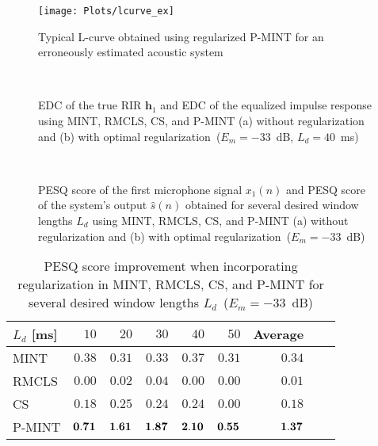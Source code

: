\documentclass[draftcls,onecolumn,11pt]{IEEEtran}
\begin{document}
\begin{figure}[h]
\centering
\texttt{[image: Plots/lcurve\_ex]}
\caption{Typical L-curve obtained using regularized P-MINT for an erroneously estimated acoustic system}
\label{fig: lcurveex}
\end{figure}

\begin{figure*}[h]
\centering
\hbox{\hspace{-1.1cm}
}
\caption{EDC of the true RIR $\mathbf{h}_1$ and EDC of the equalized impulse response using MINT, RMCLS, CS, and P-MINT (a) without regularization and (b) with optimal regularization~($E_m = -33$~dB, $L_d = 40$~ms)}
\end{figure*}
\begin{figure*}[h]
\centering
\hbox{\hspace{-1.1cm}
}
\caption{PESQ score of the first microphone signal $x_1(n)$ and PESQ score of the system's output $\hat{s}(n)$ obtained for several desired window lengths $L_d$ using MINT, RMCLS, CS, and P-MINT (a) without regularization and (b) with optimal regularization~($E_m = -33$~dB)}
\end{figure*}


\begin{table}[h]
\centering
\caption{PESQ score improvement when incorporating regularization in MINT, RMCLS, CS, and P-MINT for several desired window lengths $L_d$~($E_m = -33$~dB)}
\label{tbl: pesq1}
\begin{tabular}{|l|r|r|r|r|r|r|r|r|}
\hline
$L_d$ [ms] & $10$ & $20$ & $30$ & $40$ & $50$ & Average  \\
\hline
MINT & $0.38$ & $0.31$ & $0.33$ & $0.37$ & $0.31$ & $0.34$ \\
\hline
RMCLS & $0.00$ & $0.02$ & $0.04$ & $0.00$ & $0.00$ & $0.01$ \\
\hline
CS & $0.18$ & $0.25$ & $0.24$ & $0.24$ & $0.00$ & $0.18$ \\
\hline
P-MINT & $\bf{0.71}$ & $\bf{1.61}$ & $\bf{1.87}$ & $\bf{2.10}$ & $\bf{0.55}$ & $\bf{1.37}$ \\
\hline
\end{tabular}

\end{table}
\end{document}
